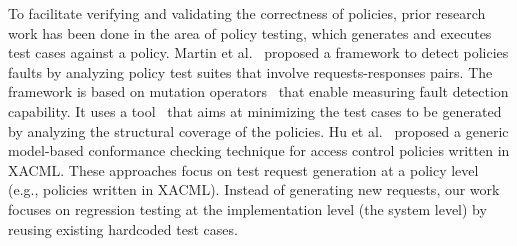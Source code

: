 
To facilitate verifying and validating the correctness of policies, prior
research work has been done in the area of policy testing, which generates and executes test cases against a policy.
Martin et al.~\cite{martin06:defining} proposed a framework to detect policies faults by analyzing
policy test suites that involve 
requests-responses pairs. The framework is based on mutation operators~\cite{martin07:fault} that enable measuring fault detection capability. 
It uses a tool~\cite {martin07:automated} that aims at minimizing the test cases to be generated by analyzing the structural coverage of the policies.
Hu et al.~\cite{hu07:conformance} proposed a generic model-based conformance checking technique for access control policies written in
XACML.
These approaches focus on test request generation at a policy level (e.g., policies written in XACML).
Instead of generating new requests, our work focuses on regression testing at the implementation level (the system level) by
reusing existing hardcoded test cases.



%
%

%

 


